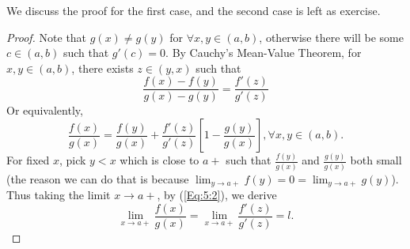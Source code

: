 We discuss the proof for the first case, and the second case is left as exercise.
\begin{proof}
Note that $g(x)\ne g(y)$ for $\forall x,y\in(a,b)$, otherwise there will be some $c\in(a,b)$ such that $g'(c)=0$. By Cauchy's Mean-Value Theorem, for $x,y\in(a,b)$, there exists $z\in (y,x)$ such that
\[
\frac{f(x) - f(y)}{g(x) - g(y)}=\frac{f'(z)}{g'(z)}
\]
Or equivalently,
\begin{equation}
\frac{f(x)}{g(x)}=\frac{f(y)}{g(x)}+\frac{f'(z)}{g'(z)}\left[1-\frac{g(y)}{g(x)}\right],\forall x,y\in(a,b).\label{Eq:5:2}
\end{equation}
For fixed $x$, pick $y< x$ which is close to $a+$ such that $\frac{f(y)}{g(x)}$ and $\frac{g(y)}{g(x)}$ both small (the reason we can do that is because $\lim_{y\to a+}f(y)=0=\lim_{y\to a+}g(y)$). Thus taking the limit $x\to a+$, by (\ref{Eq:5:2}), we derive
\[
\lim_{x\to a+}\frac{f(x)}{g(x)}=\lim_{x\to a+}\frac{f'(z)}{g'(z)}=l.
\]
\end{proof}

